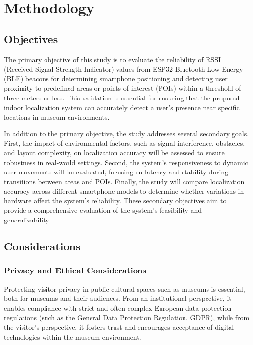 \chapter{Methodology}
\label{chap:methodology}

\section{Objectives}

The primary objective of this study is to evaluate the reliability of RSSI (Received Signal Strength Indicator) values from ESP32 Bluetooth Low Energy (BLE) beacons for determining smartphone positioning and detecting user proximity to predefined areas or points of interest (POIs) within a threshold of three meters or less. This validation is essential for ensuring that the proposed indoor localization system can accurately detect a user's presence near specific locations in museum environments.

In addition to the primary objective, the study addresses several secondary goals. First, the impact of environmental factors, such as signal interference, obstacles, and layout complexity, on localization accuracy will be assessed to ensure robustness in real-world settings. Second, the system’s responsiveness to dynamic user movements will be evaluated, focusing on latency and stability during transitions between areas and POIs. Finally, the study will compare localization accuracy across different smartphone models to determine whether variations in hardware affect the system’s reliability. These secondary objectives aim to provide a comprehensive evaluation of the system’s feasibility and generalizability.

\section{Considerations}

\subsection{Privacy and Ethical Considerations}

Protecting visitor privacy in public cultural spaces such as museums is essential, both for museums and their audiences. From an institutional perspective, it enables compliance with strict and often complex European data protection regulations (such as the General Data Protection Regulation, GDPR), while from the visitor's perspective, it fosters trust and encourages acceptance of digital technologies within the museum environment.

